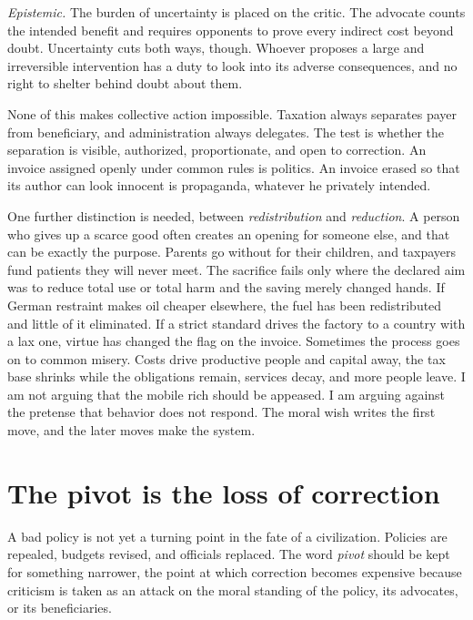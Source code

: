 \documentclass[12pt,a4paper]{book}
\begin{document}
\emph{Epistemic.} The burden of uncertainty is placed on the critic. The advocate counts the intended benefit and requires opponents to prove every indirect cost beyond doubt. Uncertainty cuts both ways, though. Whoever proposes a large and irreversible intervention has a duty to look into its adverse consequences, and no right to shelter behind doubt about them.

None of this makes collective action impossible. Taxation always separates payer from beneficiary, and administration always delegates. The test is whether the separation is visible, authorized, proportionate, and open to correction. An invoice assigned openly under common rules is politics. An invoice erased so that its author can look innocent is propaganda, whatever he privately intended.

One further distinction is needed, between \emph{redistribution} and \emph{reduction}. A person who gives up a scarce good often creates an opening for someone else, and that can be exactly the purpose. Parents go without for their children, and taxpayers fund patients they will never meet. The sacrifice fails only where the declared aim was to reduce total use or total harm and the saving merely changed hands. If German restraint makes oil cheaper elsewhere, the fuel has been redistributed and little of it eliminated. If a strict standard drives the factory to a country with a lax one, virtue has changed the flag on the invoice. Sometimes the process goes on to common misery. Costs drive productive people and capital away, the tax base shrinks while the obligations remain, services decay, and more people leave. I am not arguing that the mobile rich should be appeased. I am arguing against the pretense that behavior does not respond. The moral wish writes the first move, and the later moves make the system.

\section{The pivot is the loss of correction}

A bad policy is not yet a turning point in the fate of a civilization. Policies are repealed, budgets revised, and officials replaced. The word \emph{pivot} should be kept for something narrower, the point at which correction becomes expensive because criticism is taken as an attack on the moral standing of the policy, its advocates, or its beneficiaries.
\end{document}

